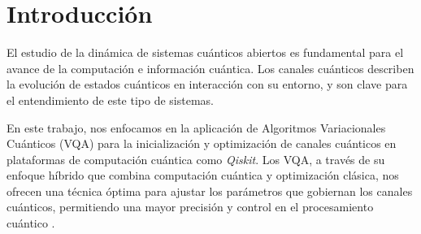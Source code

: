 \newpage
\section{Introducción}

El estudio de la dinámica de sistemas cuánticos abiertos es fundamental para el avance de la computación e información cuántica. Los canales cuánticos describen la evolución de estados cuánticos en  interacción con su entorno, y son clave para el entendimiento de este tipo de sistemas.

En este trabajo, nos enfocamos en la aplicación de Algoritmos Variacionales Cuánticos (VQA) para la inicialización y optimización de canales cuánticos en plataformas de computación cuántica como \textit{Qiskit}\cite{Qiskit}. Los VQA, a través de su enfoque híbrido que combina computación cuántica y optimización clásica, nos ofrecen una técnica óptima para ajustar los parámetros que gobiernan los canales cuánticos, permitiendo una mayor precisión y control en el procesamiento cuántico \cite{VQA}.


